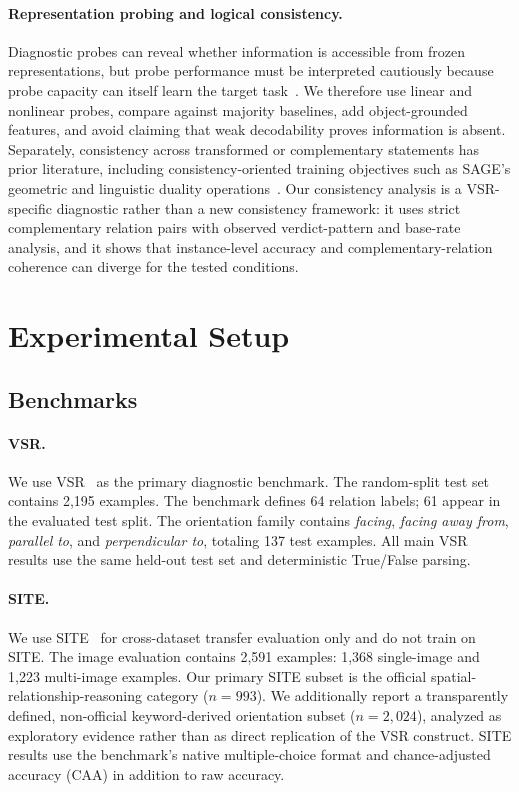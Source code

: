 \paragraph{Representation probing and logical consistency.}
Diagnostic probes can reveal whether information is accessible from frozen representations, but probe performance must be interpreted cautiously because probe capacity can itself learn the target task~\cite{hewitt2019probes}. We therefore use linear and nonlinear probes, compare against majority baselines, add object-grounded features, and avoid claiming that weak decodability proves information is absent. Separately, consistency across transformed or complementary statements has prior literature, including consistency-oriented training objectives such as SAGE's geometric and linguistic duality operations~\cite{liu2026sage}. Our consistency analysis is a VSR-specific diagnostic rather than a new consistency framework: it uses strict complementary relation pairs with observed verdict-pattern and base-rate analysis, and it shows that instance-level accuracy and complementary-relation coherence can diverge for the tested conditions.

\section{Experimental Setup}
\label{sec:setup}
\subsection{Benchmarks}
\paragraph{VSR.}
We use VSR~\cite{liu2023vsr} as the primary diagnostic benchmark. The random-split test set contains 2,195 examples. The benchmark defines 64 relation labels; 61 appear in the evaluated test split. The orientation family contains \emph{facing}, \emph{facing away from}, \emph{parallel to}, and \emph{perpendicular to}, totaling 137 test examples. All main VSR results use the same held-out test set and deterministic True/False parsing.

\paragraph{SITE.}
We use SITE~\cite{wang2025site} for cross-dataset transfer evaluation only and do not train on SITE. The image evaluation contains 2,591 examples: 1,368 single-image and 1,223 multi-image examples. Our primary SITE subset is the official spatial-relationship-reasoning category ($n=993$). We additionally report a transparently defined, non-official keyword-derived orientation subset ($n=2{,}024$), analyzed as exploratory evidence rather than as direct replication of the VSR construct. SITE results use the benchmark's native multiple-choice format and chance-adjusted accuracy (CAA) in addition to raw accuracy.

